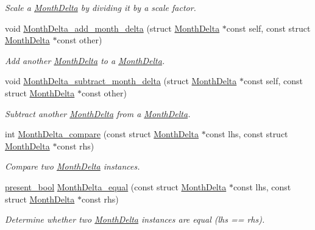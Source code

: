\begin{DoxyCompactItemize}
\begin{DoxyCompactList}\small\item\em \-Scale a \hyperlink{structMonthDelta}{\-Month\-Delta} by dividing it by a scale factor. \end{DoxyCompactList}\item 
void \hyperlink{month-delta_8h_a83addeaf706975d666783697489c70ce}{\-Month\-Delta\-\_\-add\-\_\-month\-\_\-delta} (struct \hyperlink{structMonthDelta}{\-Month\-Delta} $\ast$const self, const struct \hyperlink{structMonthDelta}{\-Month\-Delta} $\ast$const other)
\begin{DoxyCompactList}\small\item\em \-Add another \hyperlink{structMonthDelta}{\-Month\-Delta} to a \hyperlink{structMonthDelta}{\-Month\-Delta}. \end{DoxyCompactList}\item 
void \hyperlink{month-delta_8h_a3766040b320189e4548ab4a648877319}{\-Month\-Delta\-\_\-subtract\-\_\-month\-\_\-delta} (struct \hyperlink{structMonthDelta}{\-Month\-Delta} $\ast$const self, const struct \hyperlink{structMonthDelta}{\-Month\-Delta} $\ast$const other)
\begin{DoxyCompactList}\small\item\em \-Subtract another \hyperlink{structMonthDelta}{\-Month\-Delta} from a \hyperlink{structMonthDelta}{\-Month\-Delta}. \end{DoxyCompactList}\item 
int \hyperlink{month-delta_8h_a1428161f8576c24beb2208127abd890e}{\-Month\-Delta\-\_\-compare} (const struct \hyperlink{structMonthDelta}{\-Month\-Delta} $\ast$const lhs, const struct \hyperlink{structMonthDelta}{\-Month\-Delta} $\ast$const rhs)
\begin{DoxyCompactList}\small\item\em \-Compare two \hyperlink{structMonthDelta}{\-Month\-Delta} instances. \end{DoxyCompactList}\item 
\hyperlink{types_8h_a1c24e2cdd988b886e889080ded176ae0}{present\-\_\-bool} \hyperlink{month-delta_8h_a91491c8d411b52dee3ecd6bcf0b3f097}{\-Month\-Delta\-\_\-equal} (const struct \hyperlink{structMonthDelta}{\-Month\-Delta} $\ast$const lhs, const struct \hyperlink{structMonthDelta}{\-Month\-Delta} $\ast$const rhs)
\begin{DoxyCompactList}\small\item\em \-Determine whether two \hyperlink{structMonthDelta}{\-Month\-Delta} instances are equal (lhs == rhs). \end{DoxyCompactList}\item 

\end{DoxyCompactItemize}
